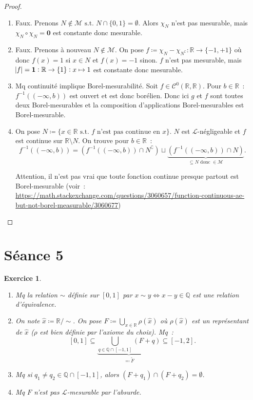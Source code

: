\documentclass{article}
\newtheorem{ex}{Exercice}[section]
\newcommand{\minfty}{{-\infty}}
\newcommand{\st}{\text{ s.t. }}
\newcommand{\C}{\complement}
\newcommand{\Q}{{\mathbb Q}}
\newcommand{\R}{{\mathbb R}}
\begin{document}
\begin{proof}~
\begin{enumerate}
	\item Faux. Prenons $N \not \in \mathcal M \st N \cap \{0, 1\} = \emptyset$. Alors $\chi_N$ n'est pas mesurable, mais $\chi_N \circ \chi_N = \mathbf 0$
	est constante donc mesurable.
	\item Faux. Prenons à nouveau $N \not \in \mathcal M$. On pose $f \coloneqq \chi_N - \chi_{N^\C} : \R \to \{-1, +1\}$ où donc $f(x) = 1$ si $x \in N$ et $f(x) = -1$ sinon.
	$f$ n'est pas mesurable, mais $\abs f = \mathbf 1 : \R \to \{1\} : x \mapsto 1$ est constante donc mesurable.
	\item Mq continuité implique Borel-mesurabilité. Soit $f \in \mathcal C^0(\R, \R)$. Pour $b \in \R$~: $f^{-1}((\minfty, b))$ est ouvert et est donc borélien.
	Donc ici $g$ et $f$ sont toutes deux Borel-mesurables et la composition d'applications Borel-mesurables est Borel-mesurable.
	\item On pose $N \coloneqq \{x \in \R \st f \text{ n'est pas continue en } x\}$. $N$ est $\mathcal L$-négligeable et $f$ est continue sur $\R \setminus N$. On trouve pour $b \in \R$~:
	\[f^{-1}((\minfty, b)) = \left(f^{-1}((\minfty, b)) \cap N^\C\right) \sqcup \underbrace {\left(f^{-1}((\minfty, b)) \cap N\right)}_{\subseteq N \text{ donc } \in \mathcal M}.\]

	Attention, il n'est pas vrai que toute fonction continue presque partout est Borel-mesurable (voir~: {\scriptsize \url{https://math.stackexchange.com/questions/3060657/function-continuous-ae-but-not-borel-measurable/3060677}})
\end{enumerate}
\end{proof}

\newpage
\section{Séance 5}
\begin{ex}
\begin{enumerate}
	\item Mq la relation $\sim$ définie sur $[0, 1]$ par $x \sim y \iff x-y \in \Q$ est une relation d'équivalence.
	\item On note $\hat x \coloneqq \R / \sim$. On pose $F \coloneqq \bigcup_{x \in \R}\rho(\hat x)$ où $\rho(\hat x)$ est un représentant de $\hat x$ ($\rho$ est bien
	définie par l'axiome du choix). Mq~:
	\[[0, 1] \subseteq \underbrace {\bigcup_{q \in \Q \cap [-1, 1]}(F+q)}_{\eqqcolon \tilde F} \subseteq [-1, 2].\]
	\item Mq si $q_1 \neq q_2 \in \Q \cap [-1, 1]$, alors $(F+q_1) \cap (F+q_2) = \emptyset$.
	\item Mq $F$ n'est pas $\mathcal L$-mesurable par l'absurde.
\end{enumerate}
\end{ex}
\end{document}
